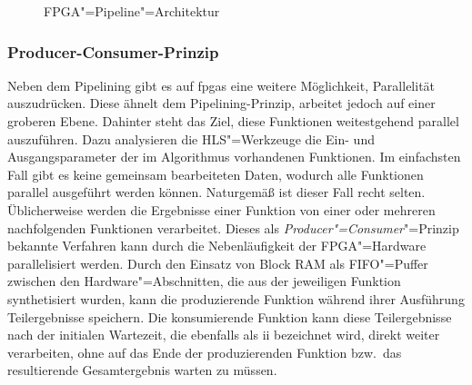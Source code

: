 \begin{figure}[htb]
    \caption{FPGA"=Pipeline"=Architektur \cite[nach][22]{hlsintro2019}}
    \label{fpga:pipelining:pipeline}
\end{figure}

\subsubsection{Producer-Consumer-Prinzip}

Neben dem Pipelining gibt es auf \gls{fpga}s eine weitere Möglichkeit,
Parallelität auszudrücken. Diese ähnelt dem Pipelining-Prinzip, arbeitet jedoch
auf einer groberen Ebene. Dahinter steht das Ziel, diese Funktionen
weitestgehend parallel auszuführen. Dazu analysieren die HLS"=Werkzeuge die Ein- 
und Ausgangsparameter der im Algorithmus vorhandenen Funktionen. Im einfachsten
Fall gibt es keine gemeinsam bearbeiteten Daten, wodurch alle Funktionen
parallel ausgeführt werden können. Naturgemäß ist dieser Fall recht selten.
Üblicherweise werden die Ergebnisse einer Funktion von einer oder mehreren
nachfolgenden Funktionen verarbeitet. Dieses als
\textit{Producer"=Consumer}"=Prinzip bekannte Verfahren kann durch die
Nebenläufigkeit der FPGA"=Hardware parallelisiert werden. Durch den Einsatz von
Block RAM als FIFO"=Puffer zwischen den Hardware"=Abschnitten, die aus der
jeweiligen Funktion synthetisiert wurden, kann die produzierende Funktion
während ihrer Ausführung Teilergebnisse speichern. Die konsumierende Funktion
kann diese Teilergebnisse nach der initialen Wartezeit, die ebenfalls als
\gls{ii} bezeichnet wird, direkt weiter verarbeiten, ohne auf das Ende der
produzierenden Funktion bzw.\ das resultierende Gesamtergebnis warten zu müssen.
\cite[vgl.][22--23]{hlsintro2019}
